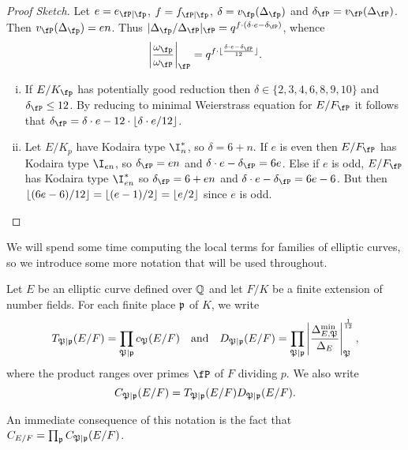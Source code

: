 \begin{proof}[Proof Sketch]
    Let $e = e_{\fP \mid \fp}$, $f = f_{\fP \mid \fp}$, $\delta = v_{\fp}(\Delta_{\fp})$ and $\delta_{\fP} = v_{\fP}(\Delta_{\fP})$. Then $v_{\fP}(\Delta_{\fp}) = e n$. Thus $|\Delta_{\fp} / \Delta_{\fP} |_{\fP} = q^{f\cdot (\delta \cdot e - \delta_{\fP})}$, whence $$\left| \frac{\omega_{\fp}}{\omega_{\fP}}\right|_{\fP} = q^{f \cdot \floor{\frac{\delta \cdot e - \delta_{\fP}}{12}}}.$$ 
    \begin{enumerate}[(i)]
        \setlength\itemsep{0em}
        \setcounter{enumi}{1}
        \item If $E / K_{\fp}$ has potentially good reduction then $\delta \in \{ 2,3,4,6,8,9,10 \}$ and $\delta_{\fP} \leq 12$. By reducing to minimal Weierstrass equation for $E / F_{\fP}$ it follows that $\delta_{\fP} = \delta\cdot e - 12 \cdot \floor{\delta\cdot e / 12}$.
        
        \item Let $E / K_p$ have Kodaira type $\I_n^*$, so $\delta = 6 + n$. If $e$ is even then $E / F_{\fP}$ has Kodaira type $\I_{en}$, so $\delta_{\fP} = en$ and $\delta \cdot e - \delta_{\fP} = 6 e$.
        Else if $e$ is odd, $E / F_{\fP}$ has Kodaira type $\I_{en}^*$ so $\delta_{\fP} = 6 + en$ and $\delta\cdot e - \delta_{\fP} = 6 e - 6$. But then $\lfloor(6e - 6)/12\rfloor = \lfloor(e - 1)/2\rfloor = \lfloor e / 2\rfloor$ since $e$ is odd.
    \end{enumerate}
\end{proof}

We will spend some time computing the local terms for families of elliptic curves, so we introduce some more notation that will be used throughout. 

\begin{notation}\label{not_contr}
    Let $E$ be an elliptic curve defined over $\mathbb{Q}$ and let $F/K$ be a finite extension of number fields. For each finite place $\mathfrak{p}$ of $K$, we write 
    $$T_{\mathfrak{P}\mid\mathfrak{p}}(E/F)=\prod_{\mathfrak{P}\mid\mathfrak{p}}c_\mathfrak{P}(E/F)\quad\text{and}\quad D_{\mathfrak{P}\mid\mathfrak{p}}(E/F)=\prod_{\mathfrak{P}\mid\mathfrak{p}}\left|\frac{\Delta_{E,\mathfrak{P}}^{\min}}{\Delta_E}\right|_\mathfrak{P}^{\frac{1}{12}},$$
    where the product ranges over primes $\fP$ of $F$ dividing $p$. We also write 
    $$C_{\mathfrak{P}\mid \mathfrak{p}}(E/F)=T_{\mathfrak{P}\mid \mathfrak{p}}(E/F)D_{\mathfrak{P}\mid \mathfrak{p}}(E/F).$$
\end{notation}

An immediate consequence of this notation is the fact that $C_{E/F}=\prod_{\mathfrak{p}}C_{\mathfrak{P}\mid \mathfrak{p}}(E / F)$.

